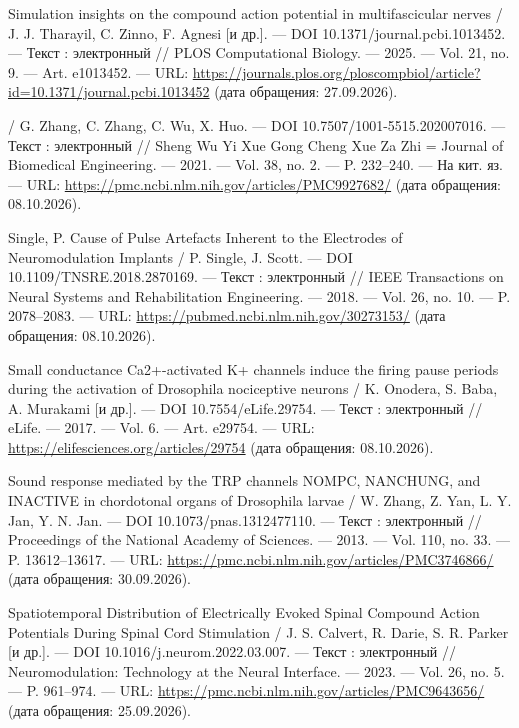 \begin{list}{}{\setlength{\leftmargin}{10mm}\setlength{\labelwidth}{8mm}\setlength{\labelsep}{2mm}\setlength{\itemsep}{0pt}\setlength{\parsep}{0pt}\setlength{\topsep}{0pt}}
\item[253.] Simulation insights on the compound action potential in multifascicular nerves / J. J. Tharayil, C. Zinno, F. Agnesi [и др.]. — DOI 10.1371/journal.pcbi.1013452. — Текст : электронный // PLOS Computational Biology. — 2025. — Vol. 21, no. 9. — Art. e1013452. — URL: \url{https://journals.plos.org/ploscompbiol/article?id=10.1371/journal.pcbi.1013452} (дата обращения: 27.09.2026).
\item[254.] [Simulation study of spinal cord stimulation evoked compound action potential] / G. Zhang, C. Zhang, C. Wu, X. Huo. — DOI 10.7507/1001-5515.202007016. — Текст : электронный // Sheng Wu Yi Xue Gong Cheng Xue Za Zhi = Journal of Biomedical Engineering. — 2021. — Vol. 38, no. 2. — P. 232–240. — На кит. яз. — URL: \url{https://pmc.ncbi.nlm.nih.gov/articles/PMC9927682/} (дата обращения: 08.10.2026).
\item[255.] Single, P. Cause of Pulse Artefacts Inherent to the Electrodes of Neuromodulation Implants / P. Single, J. Scott. — DOI 10.1109/TNSRE.2018.2870169. — Текст : электронный // IEEE Transactions on Neural Systems and Rehabilitation Engineering. — 2018. — Vol. 26, no. 10. — P. 2078–2083. — URL: \url{https://pubmed.ncbi.nlm.nih.gov/30273153/} (дата обращения: 08.10.2026).
\item[256.] Small conductance Ca2+-activated K+ channels induce the firing pause periods during the activation of Drosophila nociceptive neurons / K. Onodera, S. Baba, A. Murakami [и др.]. — DOI 10.7554/eLife.29754. — Текст : электронный // eLife. — 2017. — Vol. 6. — Art. e29754. — URL: \url{https://elifesciences.org/articles/29754} (дата обращения: 08.10.2026).
\item[257.] Sound response mediated by the TRP channels NOMPC, NANCHUNG, and INACTIVE in chordotonal organs of Drosophila larvae / W. Zhang, Z. Yan, L. Y. Jan, Y. N. Jan. — DOI 10.1073/pnas.1312477110. — Текст : электронный // Proceedings of the National Academy of Sciences. — 2013. — Vol. 110, no. 33. — P. 13612–13617. — URL: \url{https://pmc.ncbi.nlm.nih.gov/articles/PMC3746866/} (дата обращения: 30.09.2026).
\item[258.] Spatiotemporal Distribution of Electrically Evoked Spinal Compound Action Potentials During Spinal Cord Stimulation / J. S. Calvert, R. Darie, S. R. Parker [и др.]. — DOI 10.1016/j.neurom.2022.03.007. — Текст : электронный // Neuromodulation: Technology at the Neural Interface. — 2023. — Vol. 26, no. 5. — P. 961–974. — URL: \url{https://pmc.ncbi.nlm.nih.gov/articles/PMC9643656/} (дата обращения: 25.09.2026).

\end{list}
